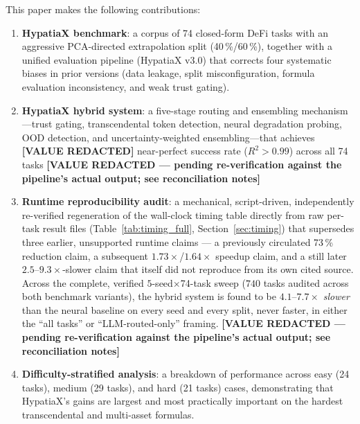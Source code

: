 \documentclass[twoside,11pt]{article}
\newcommand{\Rsq}{R^{2}}
\begin{document}
This paper makes the following contributions:

\begin{enumerate}[leftmargin=2em,label=(\roman*)]
  \item \textbf{HypatiaX benchmark}: a corpus of 74 closed-form DeFi tasks
    with an aggressive PCA-directed extrapolation split (40\,\%/60\,\%), together
    with a unified evaluation pipeline (HypatiaX v3.0) that corrects four
    systematic biases in prior versions (data leakage, split misconfiguration,
    formula evaluation inconsistency, and weak trust gating).

  \item \textbf{HypatiaX hybrid system}: a five-stage routing and ensembling
    mechanism---trust gating, transcendental token detection, neural degradation
    probing, OOD detection, and uncertainty-weighted ensembling---that achieves
    \textbf{[VALUE REDACTED]} near-perfect success rate ($\Rsq>0.99$) across all 74 tasks
    \textbf{[VALUE REDACTED --- pending re-verification against the pipeline's actual output; see reconciliation notes]}

  \item \textbf{Runtime reproducibility audit}: a mechanical, script-driven,
    independently re-verified regeneration of the wall-clock timing table
    directly from raw per-task result files (Table~\ref{tab:timing_full},
    Section~\ref{sec:timing}) that supersedes three earlier, unsupported
    runtime claims --- a previously circulated 73\,\% reduction claim, a
    subsequent $1.73\times$/$1.64\times$ speedup claim, and a still later
    $2.5$--$9.3\times$-slower claim that itself did not reproduce from its
    own cited source. Across the complete, verified $5$-seed$\times$74-task
    sweep ($740$ tasks audited across both benchmark variants), the hybrid
    system is found to be $4.1$--$7.7\times$ \emph{slower} than the neural
    baseline on every seed and every split, never faster, in either the
    ``all tasks'' or ``LLM-routed-only'' framing. \textbf{[VALUE REDACTED --- pending re-verification against the pipeline's actual output; see reconciliation notes]}

  \item \textbf{Difficulty-stratified analysis}: a breakdown of performance across
    easy (24 tasks), medium (29 tasks), and hard (21 tasks) cases, demonstrating
    that HypatiaX's gains are largest and most practically important on the hardest
    transcendental and multi-asset formulas.
\end{enumerate}
\end{document}

